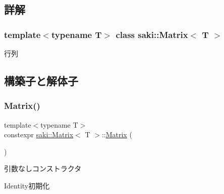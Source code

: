 \subsection{詳解}
\subsubsection*{template$<$typename T$>$\newline
class saki\+::\+Matrix$<$ T $>$}

行列 

\subsection{構築子と解体子}
\mbox{\label{classsaki_1_1_matrix_a820035e9bafc0fa4269c4b94b1ec4f4f}} 
\subsubsection{\texorpdfstring{Matrix()}{Matrix()}\hspace{0.1cm}{\footnotesize\ttfamily [1/6]}}
{\footnotesize\ttfamily template$<$typename T$>$ \\
constexpr \mbox{\hyperlink{classsaki_1_1_matrix}{saki\+::\+Matrix}}$<$ T $>$\+::\mbox{\hyperlink{classsaki_1_1_matrix}{Matrix}} (\begin{DoxyParamCaption}{ }\end{DoxyParamCaption})\hspace{0.3cm}{\ttfamily [inline]}}



引数なしコンストラクタ 

Identity初期化 \mbox{\label{classsaki_1_1_matrix_ad4f497bd4ba2b7de464afea4436d9a51}} 
